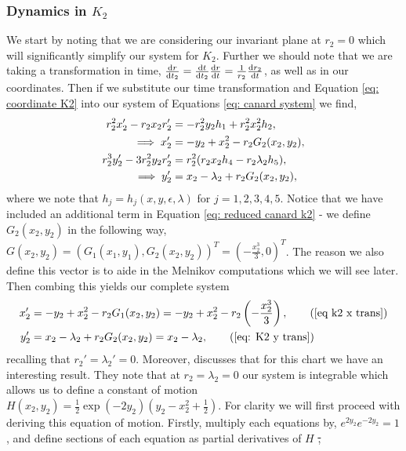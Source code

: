 \subsubsection{Dynamics in \texorpdfstring{$K_2$}{K2}}
We start by noting that we are considering our invariant plane at $r_2=0$ which will significantly simplify our system for $K_2$. Further we should note that we are taking a transformation in time, $\od{r}{t_2}=\od{t}{t_2}\od{r}{t}=\frac{1}{r_2}\od{r_2}{t}$, as well as in our coordinates. Then if we substitute our time transformation and Equation  \ref{eq: coordinate K2} into our system of Equations \ref{eq: canard system} we find, 
\begin{subequations}
	\begin{align}
	r_2^2x_2' - r_2x_2r_2'&=-r_2^2y_2h_1+r^2_2x^2_2h_2,\notag\\
	\implies x'_2&=-y_2+x_2^2-r_2G_2(x_2,y_2), \label{eq k2 x trans}\\
	r^3_2y_2'-3r_2^2y_2r_2'&=r^2_2(r_2x_2h_4-r_2\lambda_2h_5),\notag\\
	\implies y_2'&=x_2-\lambda_2+r_2G_2(x_2,y_2), \label{eq: K2 y trans}
	\end{align}
	\label{eq: reduced canard k2}
\end{subequations}
\noindent where we note that $h_j=h_j(x,y,\epsilon,\lambda)$ for $j=1,2,3,4,5$.  Notice that we have included an additional term in Equation \ref{eq: reduced canard k2} - we define $G_2(x_2,y_2)$ in the following way, $G(x_2,y_2)=(G_1(x_1,y_1),G_2(x_2,y_2))^T=(-\frac{x^3_2}{3},0)^T$. The reason we also define this vector is to aide in the Melnikov computations which we will see later. Then combing this yields our complete system
\begin{subequations}
	\begin{align}
	x'_2&=-y_2+x_2^2-r_2G_1(x_2,y_2) =-y_2+x_2^2-r_2\left(-\frac{x^3_2}{3} \right) ,\tag{\ref{eq k2 x trans}}\\
	y_2'&=x_2-\lambda_2+r_2G_2(x_2,y_2)= x_2-\lambda_2, %
	\tag{\ref{eq: K2 y trans}}
	\end{align}
\end{subequations}
recalling that $r_2'=\lambda_2'=0$. Moreover, \citet{krupa2001} discusses that for this chart we have an interesting result. They note that at $r_2=\lambda_2=0$ our system is integrable which allows us to define a constant of motion $H(x_2,y_2)=\frac{1}{2}\exp{(-2y_2)}\left(y_2-x^2_2+\frac{1}{2}\right)$. For clarity we will first proceed with deriving this equation of motion. Firstly, multiply each equations by, $e^{2y_2}e^{-2y _2}=1$, and define sections of each equation as partial derivatives of $H$ \st, 

